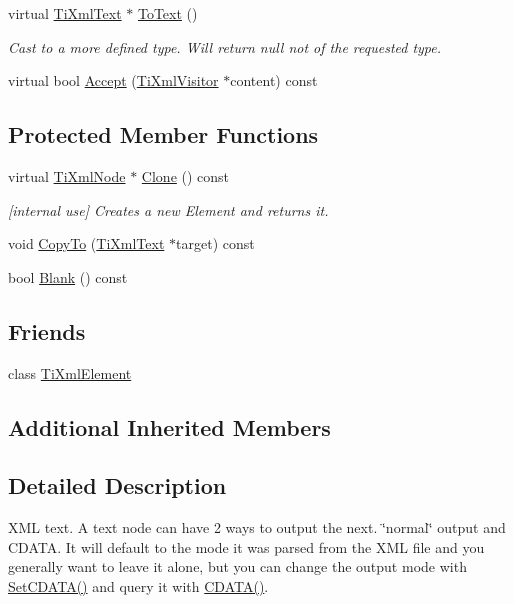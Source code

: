 \begin{DoxyCompactItemize}
virtual \hyperlink{class_ti_xml_text}{Ti\+Xml\+Text} $\ast$ \hyperlink{class_ti_xml_text_ae7c3a8fd3e4dbf6c0c4363a943d72f5b}{To\+Text} ()
\begin{DoxyCompactList}\small\item\em Cast to a more defined type. Will return null not of the requested type. \end{DoxyCompactList}\item 
virtual bool \hyperlink{class_ti_xml_text_a43b9954ebf679557fac1a4453f337b7c}{Accept} (\hyperlink{class_ti_xml_visitor}{Ti\+Xml\+Visitor} $\ast$content) const 
\end{DoxyCompactItemize}
\subsection*{Protected Member Functions}
\begin{DoxyCompactItemize}
\item 
virtual \hyperlink{class_ti_xml_node}{Ti\+Xml\+Node} $\ast$ \hyperlink{class_ti_xml_text_adde1869dfb029be50713fbfd8ce4d21f}{Clone} () const 
\begin{DoxyCompactList}\small\item\em \mbox{[}internal use\mbox{]} Creates a new Element and returns it. \end{DoxyCompactList}\item 
void \hyperlink{class_ti_xml_text_adcec7d9b6fccfc5777452bb97e6031c1}{Copy\+To} (\hyperlink{class_ti_xml_text}{Ti\+Xml\+Text} $\ast$target) const 
\item 
bool \hyperlink{class_ti_xml_text_a1c120428e3b3cf24d79706e6d2b65aa6}{Blank} () const 
\end{DoxyCompactItemize}
\subsection*{Friends}
\begin{DoxyCompactItemize}
\item 
class \hyperlink{class_ti_xml_text_ab6592e32cb9132be517cc12a70564c4b}{Ti\+Xml\+Element}
\end{DoxyCompactItemize}
\subsection*{Additional Inherited Members}


\subsection{Detailed Description}
X\+ML text. A text node can have 2 ways to output the next. \char`\"{}normal\char`\"{} output and C\+D\+A\+TA. It will default to the mode it was parsed from the X\+ML file and you generally want to leave it alone, but you can change the output mode with \hyperlink{class_ti_xml_text_acb17ff7c5d09b2c839393445a3de5ea9}{Set\+C\+D\+A\+T\+A()} and query it with \hyperlink{class_ti_xml_text_ad1a6a6b83fa2271022dd97c072a2b586}{C\+D\+A\+T\+A()}. 

